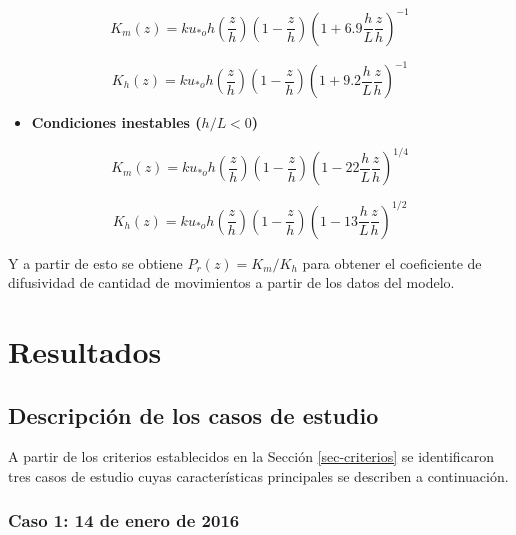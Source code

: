 \documentclass[12pt,spanish,oneside]{book}
\providecommand{\tightlist}{%
  \setlength{\itemsep}{0pt}\setlength{\parskip}{0pt}}
\begin{document}
\begin{equation} \label{k-1}
K_m(z) =  ku_{*o}h\left (\frac{z}{h} \right )\left(1-\frac{z}{h} \right)\left (1 + 6.9\frac{h}{L}\frac{z}{h} \right)^{-1}
\end{equation}

\begin{equation} \label{k-2}
K_h(z) =  ku_{*o}h\left (\frac{z}{h} \right )\left(1-\frac{z}{h} \right)\left (1 + 9.2\frac{h}{L}\frac{z}{h} \right)^{-1}
\end{equation}

\begin{itemize}
\tightlist
\item
  \textbf{Condiciones inestables (\(h/L < 0\))}
\end{itemize}

\begin{equation} \label{k-3}
K_m(z) =  ku_{*o}h\left (\frac{z}{h} \right )\left(1-\frac{z}{h} \right)\left (1 - 22\frac{h}{L}\frac{z}{h} \right)^{1/4}
\end{equation}

\begin{equation} \label{k-4}
K_h(z) =  ku_{*o}h\left (\frac{z}{h} \right )\left(1-\frac{z}{h} \right)\left (1 - 13\frac{h}{L}\frac{z}{h} \right)^{1/2}
\end{equation}

Y a partir de esto se obtiene \(P_r(z) = K_m/K_h\) para obtener el
coeficiente de difusividad de cantidad de movimientos a partir de los
datos del modelo.

\chapter{Resultados}\label{resultados}

\section{Descripción de los casos de
estudio}\label{descripcion-de-los-casos-de-estudio}

A partir de los criterios establecidos en la Sección \ref{sec-criterios}
se identificaron tres casos de estudio cuyas características principales
se describen a continuación.

\subsection{Caso 1: 14 de enero de
2016}\label{caso-1-14-de-enero-de-2016}
\end{document}
